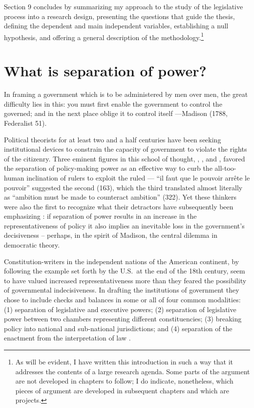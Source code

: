 Section 9 concludes by summarizing my approach to the study of the legislative process into a research design, presenting the questions that guide the thesis, defining the dependent and main independent variables, establishing a null hypothesis, and offering a general description of the methodology.\footnote{As will be evident, I have written this introduction in such a way that it addresses the contents of a large research agenda.  Some parts of the argument are not developed in chapters to follow; I do indicate, nonetheless, which pieces of argument are developed in subsequent chapters and which are projects.}

\section{What is separation of power?}
\label{s:whatSOP}

In framing a government which is to be administered by men over men, 
the great difficulty lies in this: you must first enable the government to 
control the governed; and in the next place oblige it to control itself
—Madison (1788, Federalist 51). \nocite{madison.1788}

Political theorists for at least two and a half centuries have been seeking institutional devices to constrain the capacity of government to violate the rights of the citizenry.  Three eminent figures in this school of thought, \citet{locke.1690}, \citet{montesquieu.1748}, and \citet{madison.1788}, favored the separation of policy-making power as an effective way to curb the all-too-human inclination of rulers to exploit the ruled --- ``il faut que le pouvoir arr\^ete le pouvoir'' suggested the second (163), which the third translated almost literally as ``ambition must be made to counteract ambition'' (322).  Yet these thinkers were also the first to recognize what their detractors have subsequently been emphasizing \citep[eg.][]{bagehot.1867,wilson.1884,romero.1893}: if separation of power results in an increase in the representativeness of policy it also implies an inevitable loss in the government's decisiveness – perhaps, in the spirit of Madison, the central dilemma in democratic theory.  

Constitution-writers in the independent nations of the American continent, by following the example set forth by the U.S.\ at the end of the 18th century, seem to have valued increased representativeness more than they feared the possibility of governmental indecisiveness.  In drafting the institutions of government they chose to include checks and balances in some or all of four common modalities: (1) separation of legislative and executive powers; (2) separation of legislative power between two chambers representing different constituencies; (3) breaking policy into national and sub-national jurisdictions; and (4) separation of the enactment from the interpretation of law \citep[see][]{cox.mccubbins.2001,tsebelis.1995}. 

